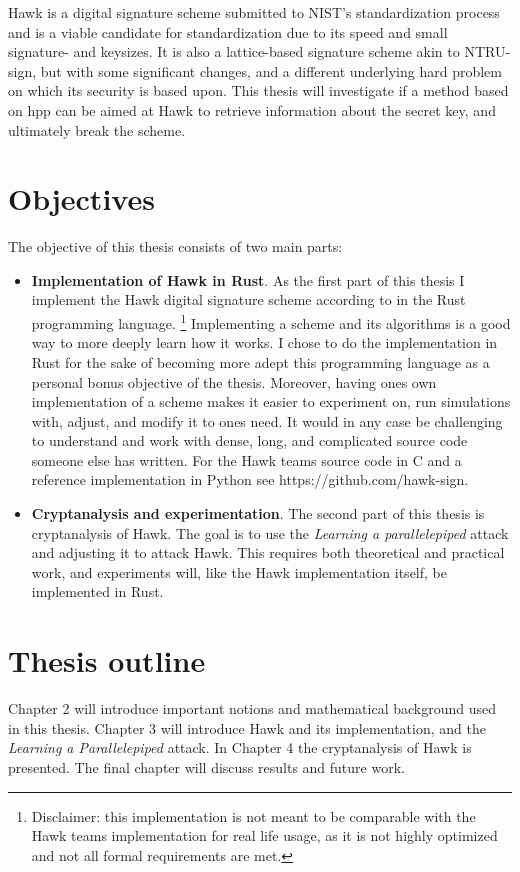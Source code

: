 Hawk \cite{HawkSpec24} is a digital signature scheme submitted to NIST's standardization process and is a viable candidate for standardization
due to its speed and small signature- and keysizes. It is also a lattice-based signature scheme akin to NTRU-sign, but with some significant changes, and a different underlying hard problem on which its security is based upon. 
This thesis will investigate if a method based on \gls{hpp} can be aimed at Hawk to retrieve information about the secret key, and ultimately break the scheme.

\section{Objectives}
The objective of this thesis consists of two main parts:
\begin{itemize}
    \item \textbf{Implementation of Hawk in Rust}. As the first part of this thesis I implement the Hawk digital signature scheme according to \cite{HawkSpec24} in the Rust programming language.
        \footnote{Disclaimer: this implementation is not meant to be comparable with the Hawk teams implementation for real life usage, as it is not highly optimized and not all formal requirements are met.}
    Implementing a scheme and its algorithms is a good way to more deeply learn how it works. I chose to do the implementation in Rust for the sake of becoming more adept this programming language as a personal bonus objective of the thesis.
    Moreover, having ones own implementation of a scheme makes it easier to experiment on, run simulations with, adjust, and modify it to ones need. It would in any case be challenging to understand and work with dense, long, 
    and complicated source code someone else has written. For the Hawk teams source code in C and a reference implementation in Python see https://github.com/hawk-sign.


\item \textbf{Cryptanalysis and experimentation}. The second part of this thesis is cryptanalysis of Hawk. The goal is to use the \textit{Learning a parallelepiped} attack and adjusting it to attack Hawk. 
    This requires both theoretical and practical work, and experiments will, like the Hawk implementation itself, be implemented in Rust.
\end{itemize}
\section{Thesis outline}
Chapter 2 will introduce important notions and mathematical background used in this thesis. Chapter 3 will introduce Hawk and its implementation, and the \textit{Learning a Parallelepiped} attack.
In Chapter 4 the cryptanalysis of Hawk is presented. The final chapter will discuss results and future work.

